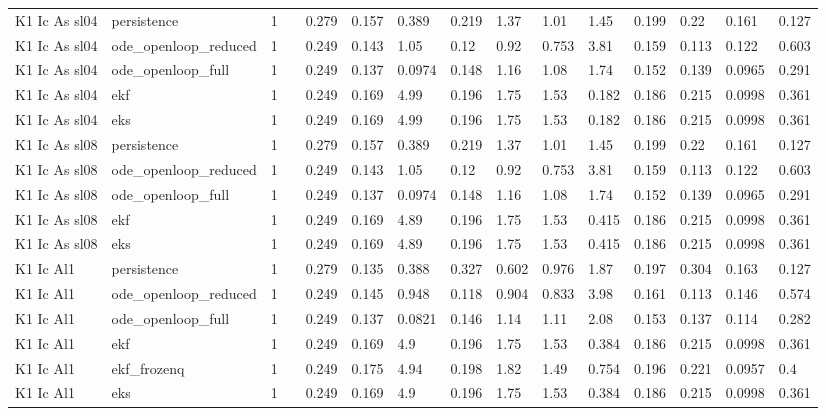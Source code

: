 \begin{table}[t]
\begin{tabular}{lllllllllllllll}
K1 Ic As sl04 & persistence & 1 &  & 0.279 & 0.157 & 0.389 & 0.219 & 1.37 & 1.01 & 1.45 & 0.199 & 0.22 & 0.161 & 0.127 \\
K1 Ic As sl04 & ode\_openloop\_reduced & 1 &  & 0.249 & 0.143 & 1.05 & 0.12 & 0.92 & 0.753 & 3.81 & 0.159 & 0.113 & 0.122 & 0.603 \\
K1 Ic As sl04 & ode\_openloop\_full & 1 &  & 0.249 & 0.137 & 0.0974 & 0.148 & 1.16 & 1.08 & 1.74 & 0.152 & 0.139 & 0.0965 & 0.291 \\
K1 Ic As sl04 & ekf & 1 &  & 0.249 & 0.169 & 4.99 & 0.196 & 1.75 & 1.53 & 0.182 & 0.186 & 0.215 & 0.0998 & 0.361 \\
K1 Ic As sl04 & eks & 1 &  & 0.249 & 0.169 & 4.99 & 0.196 & 1.75 & 1.53 & 0.182 & 0.186 & 0.215 & 0.0998 & 0.361 \\
K1 Ic As sl08 & persistence & 1 &  & 0.279 & 0.157 & 0.389 & 0.219 & 1.37 & 1.01 & 1.45 & 0.199 & 0.22 & 0.161 & 0.127 \\
K1 Ic As sl08 & ode\_openloop\_reduced & 1 &  & 0.249 & 0.143 & 1.05 & 0.12 & 0.92 & 0.753 & 3.81 & 0.159 & 0.113 & 0.122 & 0.603 \\
K1 Ic As sl08 & ode\_openloop\_full & 1 &  & 0.249 & 0.137 & 0.0974 & 0.148 & 1.16 & 1.08 & 1.74 & 0.152 & 0.139 & 0.0965 & 0.291 \\
K1 Ic As sl08 & ekf & 1 &  & 0.249 & 0.169 & 4.89 & 0.196 & 1.75 & 1.53 & 0.415 & 0.186 & 0.215 & 0.0998 & 0.361 \\
K1 Ic As sl08 & eks & 1 &  & 0.249 & 0.169 & 4.89 & 0.196 & 1.75 & 1.53 & 0.415 & 0.186 & 0.215 & 0.0998 & 0.361 \\
K1 Ic Al1 & persistence & 1 &  & 0.279 & 0.135 & 0.388 & 0.327 & 0.602 & 0.976 & 1.87 & 0.197 & 0.304 & 0.163 & 0.127 \\
K1 Ic Al1 & ode\_openloop\_reduced & 1 &  & 0.249 & 0.145 & 0.948 & 0.118 & 0.904 & 0.833 & 3.98 & 0.161 & 0.113 & 0.146 & 0.574 \\
K1 Ic Al1 & ode\_openloop\_full & 1 &  & 0.249 & 0.137 & 0.0821 & 0.146 & 1.14 & 1.11 & 2.08 & 0.153 & 0.137 & 0.114 & 0.282 \\
K1 Ic Al1 & ekf & 1 &  & 0.249 & 0.169 & 4.9 & 0.196 & 1.75 & 1.53 & 0.384 & 0.186 & 0.215 & 0.0998 & 0.361 \\
K1 Ic Al1 & ekf\_frozenq & 1 &  & 0.249 & 0.175 & 4.94 & 0.198 & 1.82 & 1.49 & 0.754 & 0.196 & 0.221 & 0.0957 & 0.4 \\
K1 Ic Al1 & eks & 1 &  & 0.249 & 0.169 & 4.9 & 0.196 & 1.75 & 1.53 & 0.384 & 0.186 & 0.215 & 0.0998 & 0.361 \\

\end{tabular}
\end{table}
